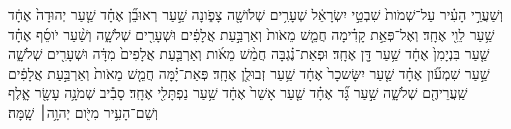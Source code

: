 \documentclass{openreader}
\begin{document}
וְשַׁעֲרֵ֣י הָעִ֗יר עַל־שְׁמֹות֙ שִׁבְטֵ֣י יִשְׂרָאֵ֔ל שְׁעָרִ֥ים שְׁלֹושָׁ֖ה צָפֹ֑ונָה שַׁ֣עַר רְאוּבֵ֞ן אֶחָ֗ד שַׁ֤עַר יְהוּדָה֙ אֶחָ֔ד שַׁ֥עַר לֵוִ֖י אֶחָֽד׃ 
וְאֶל־פְּאַ֣ת קָדִ֗ימָה חֲמֵ֤שׁ מֵאֹות֙ וְאַרְבַּ֣עַת אֲלָפִ֔ים וּשְׁעָרִ֖ים שְׁלֹשָׁ֑ה וְשַׁ֨עַר יֹוסֵ֜ף אֶחָ֗ד שַׁ֤עַר בִּנְיָמִן֙ אֶחָ֔ד שַׁ֥עַר דָּ֖ן אֶחָֽד׃ 
וּפְאַת־נֶ֗גְבָּה חֲמֵ֨שׁ מֵאֹ֜ות וְאַרְבַּ֤עַת אֲלָפִים֙ מִדָּ֔ה וּשְׁעָרִ֖ים שְׁלֹשָׁ֑ה שַׁ֣עַר שִׁמְעֹ֞ון אֶחָ֗ד שַׁ֤עַר יִשָּׂשכָר֙ אֶחָ֔ד שַׁ֥עַר זְבוּלֻ֖ן אֶחָֽד׃ 
פְּאַת־יָ֗מָּה חֲמֵ֤שׁ מֵאֹות֙ וְאַרְבַּ֣עַת אֲלָפִ֔ים שַֽׁעֲרֵיהֶ֖ם שְׁלֹשָׁ֑ה שַׁ֣עַר גָּ֞ד אֶחָ֗ד שַׁ֤עַר אָשֵׁר֙ אֶחָ֔ד שַׁ֥עַר נַפְתָּלִ֖י אֶחָֽד׃ 
סָבִ֕יב שְׁמֹנָ֥ה עָשָׂ֖ר אָ֑לֶף וְשֵׁם־הָעִ֥יר מִיֹּ֖ום יְהוָ֥ה׀ שָֽׁמָּה׃ 
\end{document}
